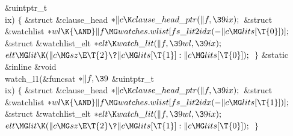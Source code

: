 \&{uintptr\_t} \\{ix})\1\1\2\2\6
${}\{{}$\1\6
\&{struct} \&{clause\_head} ${}{*}\|c\K\\{clause\_head\_ptr}(\|f,\39\\{ix});{}$%
\6
\&{struct} \&{watchlist} ${}{*}\\{wl}\K{\AND}\|f\MG\\{watches}.\\{wlist}[\\{fs%
\_lit2idx}({-}\|c\MG\\{lits}[\T{0}])];{}$\6
\&{struct} \&{watchlist\_elt} ${}{*}\\{elt}\K\\{watch\_lit}(\|f,\39\\{wl},\39%
\\{ix});{}$\7
${}\\{elt}\MG\\{lit}\K(\|c\MG\\{sz}\E\T{2}\?\|c\MG\\{lits}[\T{1}]:\|c\MG%
\\{lits}[\T{0}]);{}$\6
\4${}\}{}$\2\7
\&{static} \&{inline} \&{void} \\{watch\_l1}(\&{funcsat} ${}{*}\|f,\39{}$%
\&{uintptr\_t} \\{ix})\1\1\2\2\6
${}\{{}$\1\6
\&{struct} \&{clause\_head} ${}{*}\|c\K\\{clause\_head\_ptr}(\|f,\39\\{ix});{}$%
\6
\&{struct} \&{watchlist} ${}{*}\\{wl}\K{\AND}\|f\MG\\{watches}.\\{wlist}[\\{fs%
\_lit2idx}({-}\|c\MG\\{lits}[\T{1}])];{}$\6
\&{struct} \&{watchlist\_elt} ${}{*}\\{elt}\K\\{watch\_lit}(\|f,\39\\{wl},\39%
\\{ix});{}$\7
${}\\{elt}\MG\\{lit}\K(\|c\MG\\{sz}\E\T{2}\?\|c\MG\\{lits}[\T{1}]:\|c\MG%
\\{lits}[\T{0}]);{}$\6
\4${}\}{}$\2\par
\fi



